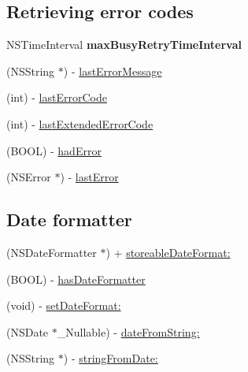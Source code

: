 \subsection*{Retrieving error codes}
\label{_amgrpc11573836c47c2d152691d4f0b5c8e00}%


 

 \begin{DoxyCompactItemize}
\item 
\mbox{\label{interface_o_p_t_l_y_f_m_d_b_database_a4e99efb63bf76c6822b28edf26f5db37}} 
N\+S\+Time\+Interval {\bfseries max\+Busy\+Retry\+Time\+Interval}
\item 
(N\+S\+String $\ast$) -\/ \mbox{\hyperlink{interface_o_p_t_l_y_f_m_d_b_database_a082c5d58576df07956308656064e1f63}{last\+Error\+Message}}
\item 
(int) -\/ \mbox{\hyperlink{interface_o_p_t_l_y_f_m_d_b_database_a9f15cf87d3c764783ce0c6beb39393a9}{last\+Error\+Code}}
\item 
(int) -\/ \mbox{\hyperlink{interface_o_p_t_l_y_f_m_d_b_database_a1f6aef053fa570de3c6c3d1e8bc34989}{last\+Extended\+Error\+Code}}
\item 
(B\+O\+OL) -\/ \mbox{\hyperlink{interface_o_p_t_l_y_f_m_d_b_database_afc9d747532c96f0f2afb78dd84caee87}{had\+Error}}
\item 
(N\+S\+Error $\ast$) -\/ \mbox{\hyperlink{interface_o_p_t_l_y_f_m_d_b_database_a477a6ff4d9daaac53a56c0a058a0d2f7}{last\+Error}}
\end{DoxyCompactItemize}
\subsection*{Date formatter}
\label{_amgrpfedd80d3d4f54fb7c04e443000dc1e76}%


 

 \begin{DoxyCompactItemize}
\item 
(N\+S\+Date\+Formatter $\ast$) + \mbox{\hyperlink{interface_o_p_t_l_y_f_m_d_b_database_acb3eef48cd21dcb11407b88dac662c57}{storeable\+Date\+Format\+:}}
\item 
(B\+O\+OL) -\/ \mbox{\hyperlink{interface_o_p_t_l_y_f_m_d_b_database_a820a1ababb4c5496800b9bcd5f2de784}{has\+Date\+Formatter}}
\item 
(void) -\/ \mbox{\hyperlink{interface_o_p_t_l_y_f_m_d_b_database_a48c1936bc68ddd11cea9aa177b0cc94e}{set\+Date\+Format\+:}}
\item 
(N\+S\+Date $\ast$\+\_\+\+Nullable) -\/ \mbox{\hyperlink{interface_o_p_t_l_y_f_m_d_b_database_a5368268fe8e6d881d0da4d3538607768}{date\+From\+String\+:}}
\item 
(N\+S\+String $\ast$) -\/ \mbox{\hyperlink{interface_o_p_t_l_y_f_m_d_b_database_a60793c2b214e29c00143fdf9510837d7}{string\+From\+Date\+:}}
\end{DoxyCompactItemize}


